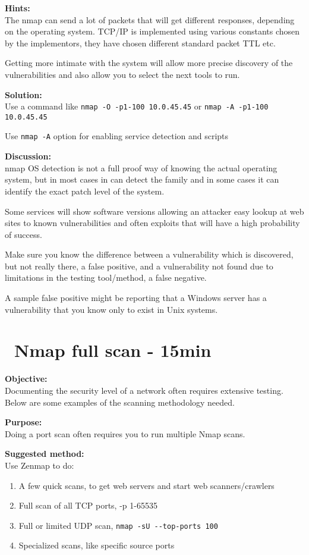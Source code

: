 \documentclass[a4paper,11pt,notitlepage]{report}
\begin{document}
{\bf Hints:} \\
The nmap can send a lot of packets that will get different responses, depending on the operating system. TCP/IP is implemented using various constants chosen by the implementors, they have chosen different standard packet TTL etc.

Getting more intimate with the system will allow more precise discovery of the vulnerabilities and also allow you to select the next tools to run.

{\bf Solution:}\\
Use a command like \verb+nmap -O -p1-100 10.0.45.45+ or  \verb+nmap -A -p1-100 10.0.45.45+

Use \verb+nmap -A+ option for enabling service detection and scripts

{\bf Discussion:}\\
nmap OS detection is not a full proof way of knowing the actual operating system, but in most cases in can detect the family and in some cases it can identify the exact patch level of the system.

Some services will show software versions allowing an attacker easy lookup at web sites to known vulnerabilities and often exploits that will have a high probability of success.

Make sure you know the difference between a vulnerability which is discovered, but not really there, a false positive, and a vulnerability not found due to limitations in the testing tool/method, a false negative.

A sample false positive might be reporting that a Windows server has a vulnerability that you know only to exist in Unix systems.


\chapter{\faInfoCircle\ Nmap full scan - 15min}
\label{ex:nmap-strategy}


{\bf Objective:} \\
Documenting the security level of a network often requires extensive testing. Below are some examples of the scanning methodology needed.


{\bf Purpose:}\\
Doing a port scan often requires you to run multiple Nmap scans.


{\bf Suggested method:}\\
Use Zenmap to do:
\begin{enumerate}
\item A few quick scans, to get web servers and start web scanners/crawlers
\item Full scan of all TCP ports, -p 1-65535
\item Full or limited UDP scan, \verb+nmap -sU --top-ports 100+
\item Specialized scans, like specific source ports
\end{enumerate}
\end{document}
